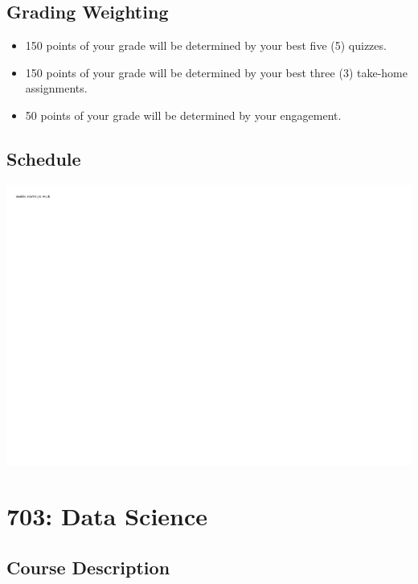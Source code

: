 \hypertarget{grading-weighting}{%
\section*{Grading Weighting}\label{grading-weighting}}


\begin{itemize}
\tightlist
\item
  150 points of your grade will be determined by your best five (5) quizzes.
\item
  150 points of your grade will be determined by your best three (3) take-home assignments.
\item
  50 points of your grade will be determined by your engagement.
\end{itemize}

\hypertarget{schedule-2}{%
\section*{Schedule}\label{schedule-2}}


\includegraphics{0203_testing_files/figure-latex/unnamed-chunk-3-1.pdf}

\hypertarget{data-science}{%
\chapter*{703: Data Science}\label{data-science}}


\hypertarget{course-description-3}{%
\section*{Course Description}\label{course-description-3}}


